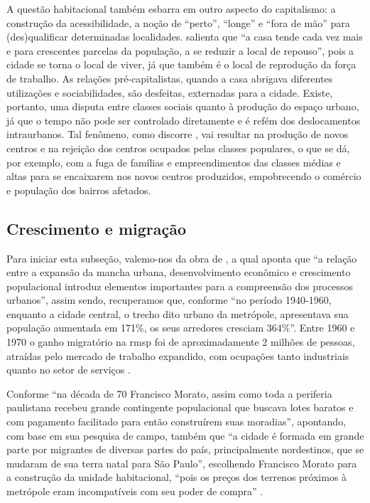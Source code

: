 	A questão habitacional também esbarra em outro aspecto do capitalismo: a construção da acessibilidade, a noção de ``perto'', ``longe'' e ``fora de mão'' para (des)qualificar determinadas localidades.  salienta que ``a casa tende cada vez mais e para crescentes parcelas da população, a se reduzir a local de repouso'', pois a cidade se torna o local de viver, já que também é o local de reprodução da força de trabalho. As relações pré-capitalistas, quando a casa abrigava diferentes utilizações e sociabilidades, são desfeitas, externadas para a cidade. Existe, portanto, uma disputa entre classes sociais quanto à produção do espaço urbano, já que o tempo não pode ser controlado diretamente e é refém dos deslocamentos intraurbanos. Tal fenômeno, como discorre , vai resultar na produção de novos centros e na rejeição dos centros ocupados pelas classes populares, o que se dá, por exemplo, com a fuga de famílias e empreendimentos das classes médias e altas para se encaixarem nos novos centros produzidos, empobrecendo o comércio e população dos bairros afetados.
	
	\subsection{Crescimento e migração} \label{CrescimentoMigracao}
	
	Para iniciar esta subseção, valemo-nos da obra de , a qual aponta que ``a relação entre a expansão da mancha urbana, desenvolvimento econômico e crescimento populacional introduz elementos importantes para a compreensão dos processos urbanos'', assim sendo, recuperamos que, conforme  ``no período 1940-1960, enquanto a cidade central, o trecho dito urbano da metrópole, apresentava sua população aumentada em 171\%, os seus arredores cresciam 364\%''. Entre 1960 e 1970 o ganho migratório na \glsdesc{rmsp} foi de aproximadamente 2 milhões de pessoas, atraídas pelo mercado de trabalho expandido, com ocupações tanto industriais quanto no setor de serviços \cite[p.42]{meyer2004}.
	
	Conforme  ``na década de 70 Francisco Morato, assim como toda a periferia paulistana recebeu grande contingente populacional que buscava lotes baratos e com pagamento facilitado para então construírem suas moradias'', apontando, com base em sua pesquisa de campo, também que ``a cidade é formada em grande parte por migrantes de diversas partes do país, principalmente nordestinos, que se mudaram de sua terra natal para São Paulo'', escolhendo Francisco Morato para a  construção da unidade habitacional, ``pois os preços dos terrenos próximos à metrópole eram incompatíveis com seu poder de compra'' .

